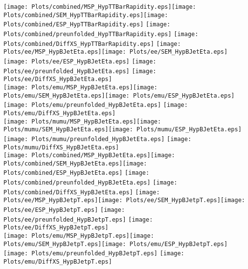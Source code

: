 \documentclass[a4paper,10pt,landscape,pagesize]{scrartcl}
\begin{document}
\texttt{[image: Plots/combined/MSP\_HypTTBarRapidity.eps]}\texttt{[image: Plots/combined/SEM\_HypTTBarRapidity.eps]}\texttt{[image: Plots/combined/ESP\_HypTTBarRapidity.eps]} \texttt{[image: Plots/combined/preunfolded\_HypTTBarRapidity.eps]} \texttt{[image: Plots/combined/DiffXS\_HypTTBarRapidity.eps]}
\newpage
\texttt{[image: Plots/ee/MSP\_HypBJetEta.eps]}\texttt{[image: Plots/ee/SEM\_HypBJetEta.eps]}\texttt{[image: Plots/ee/ESP\_HypBJetEta.eps]} \texttt{[image: Plots/ee/preunfolded\_HypBJetEta.eps]} \texttt{[image: Plots/ee/DiffXS\_HypBJetEta.eps]}\\
\texttt{[image: Plots/emu/MSP\_HypBJetEta.eps]}\texttt{[image: Plots/emu/SEM\_HypBJetEta.eps]}\texttt{[image: Plots/emu/ESP\_HypBJetEta.eps]} \texttt{[image: Plots/emu/preunfolded\_HypBJetEta.eps]} \texttt{[image: Plots/emu/DiffXS\_HypBJetEta.eps]}\\
\texttt{[image: Plots/mumu/MSP\_HypBJetEta.eps]}\texttt{[image: Plots/mumu/SEM\_HypBJetEta.eps]}\texttt{[image: Plots/mumu/ESP\_HypBJetEta.eps]} \texttt{[image: Plots/mumu/preunfolded\_HypBJetEta.eps]} \texttt{[image: Plots/mumu/DiffXS\_HypBJetEta.eps]}\\
\texttt{[image: Plots/combined/MSP\_HypBJetEta.eps]}\texttt{[image: Plots/combined/SEM\_HypBJetEta.eps]}\texttt{[image: Plots/combined/ESP\_HypBJetEta.eps]} \texttt{[image: Plots/combined/preunfolded\_HypBJetEta.eps]} \texttt{[image: Plots/combined/DiffXS\_HypBJetEta.eps]}
\newpage
\texttt{[image: Plots/ee/MSP\_HypBJetpT.eps]}\texttt{[image: Plots/ee/SEM\_HypBJetpT.eps]}\texttt{[image: Plots/ee/ESP\_HypBJetpT.eps]} \texttt{[image: Plots/ee/preunfolded\_HypBJetpT.eps]} \texttt{[image: Plots/ee/DiffXS\_HypBJetpT.eps]}\\
\texttt{[image: Plots/emu/MSP\_HypBJetpT.eps]}\texttt{[image: Plots/emu/SEM\_HypBJetpT.eps]}\texttt{[image: Plots/emu/ESP\_HypBJetpT.eps]} \texttt{[image: Plots/emu/preunfolded\_HypBJetpT.eps]} \texttt{[image: Plots/emu/DiffXS\_HypBJetpT.eps]}\\
\end{document}
